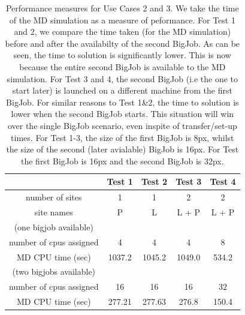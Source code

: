 \documentclass[conference,final]{IEEEtran}
\newcommand{\jhanote}[1]{ {\textcolor{red} { ***Jha: #1 }}}
\newcommand{\jhanote}[1]{}
\begin{document}

\begin{table}[!h]
\begin{center}
  \caption{\small 
Performance measures for Use Cases 2 and 3. We take the time of the MD simulation as a measure of peformance.
For Test 1 and 2, we compare the time taken (for the MD simulation) before and after the availabilty of
the second BigJob. As can be seen, the time to solution is significantly lower. This is now because
the entire second BigJob is available to the MD simulation. 
For Test 3 and 4, the second BigJob (i.e the one to start later) is launched on a different machine
from the first BigJob. For similar reasons to Test 1\&2, the time to solution is lower when the
second BigJob starts. This situation will win over the single BigJob scenario, even inspite of transfer/set-up times. For Test 1-3, the size of the first BigJob is 8px, whilst the size of the second (later avialable) BigJob is 16px. For Test the first BigJob is 16px and the second BigJob is 32px.}
\label{table:TwoBigJobs}
\begin{tabular}{ c| c c c c }
\hline
 & Test 1   & Test 2 & Test 3   & Test 4 \\
\hline
number of sites & 1 & 1 & 2 & 2  \\
site names & P & L  & L + P & L + P \\
\hline
(one bigjob available) & & & & \\
number of cpus assigned & 4 & 4 & 4 & 8 \\
MD CPU time  (sec) & 1037.2 & 1045.2 & 1049.0 & 534.2  \\
\hline
(two bigjobs available) & & & & \\
number of cpus assigned & 16 & 16 & 16 & 32 \\

MD CPU time  (sec) & 277.21 & 277.63  & 276.8 & 150.4  \\

\hline
\end{tabular}
\end{center}
\end{table}
\end{document}
